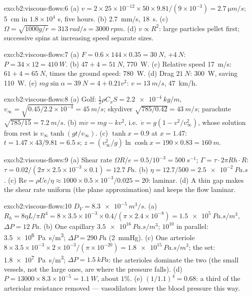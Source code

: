\begin{solution}{exo:b2:viscous-flows:6}
(a) $v = 2 \times 25 \times 10^{-12} \times 50 \times 9.81/(9 \times 10^{-3}) = \qty{2.7}{\micro m/s}$;
\qty{5}{cm} in $1.8 \times 10^4$ s, five hours. (b) \qty{2.7}{mm/s}, \qty{18}{s}. (c)
$\Omega = \sqrt{1000g/r} = \qty{313}{rad/s} = \qty{3000}{rpm}$. (d) $v \propto R^2$: large
particles pellet first; successive spins at increasing speed separate
sizes.
\end{solution}

\begin{solution}{exo:b2:viscous-flows:7}
(a) $F = 0.6 \times 144 \times 0.35 = \qty{30}{N}$, $+\qty{4}{N}$: $P = 34 \times 12 =
\qty{410}{W}$. (b) $47 + 4 = \qty{51}{N}$, \qty{770}{W}. (c) Relative speed
\qty{17}{m/s}: $61 + 4 = \qty{65}{N}$, times the ground speed: \qty{780}{W}. (d)
Drag $\qty{21}{N}$: \qty{300}{W}, saving \qty{110}{W}. (e) $mg\sin\alpha = \qty{39}{N} =
4 + 0.21v^2$: $v = \qty{13}{m/s}$, \qty{47}{km/h}.
\end{solution}

\begin{solution}{exo:b2:viscous-flows:8}
(a) Golf: $\tfrac12\rho C_xS = \qty{2.2e-4}{kg/m}$, $v_\infty = \sqrt{0.45/2.2 \times 10^{-4}}
= \qty{45}{m/s}$; skydiver $\sqrt{785/0.42} = \qty{43}{m/s}$; parachute $\sqrt{785/15} =
\qty{7.2}{m/s}$. (b) $m\dot v = mg - kv^2$, i.e.\ $\dot v = g(1 - v^2/v_\infty^2)$,
whose solution from rest is $v_\infty\tanh(gt/v_\infty)$. (c) $\tanh x = 0.9$ at
$x = 1.47$: $t = 1.47 \times 43/9.81 = \qty{6.5}{s}$; $z = (v_\infty^2/g)\ln\cosh x =
190 \times 0.83 = \qty{160}{m}$.
\end{solution}

\begin{solution}{exo:b2:viscous-flows:9}
(a) Shear rate $\Omega R/e = 0.5/10^{-3} = \qty{500}{s^{-1}}$; $\Gamma = \tau\cdot2\pi Rh
\cdot R$: $\tau = 0.02/(2\pi \times 2.5 \times 10^{-3} \times 0.1) = \qty{12.7}{Pa}$. (b) $\eta
= 12.7/500 = \qty{2.5e-2}{Pa.s}$. (c) $\mathrm{Re} = \rho Ue/\eta \approx 1000 \times 0.5 \times
10^{-3}/0.025 = 20$: laminar. (d) A thin gap makes the shear rate uniform
(the plane approximation) and keeps the flow laminar.
\end{solution}

\begin{solution}{exo:b2:viscous-flows:10}
$D_V = \qty{8.3e-5}{m^3/s}$. (a) $R_h = 8\eta L/\pi R^4 = 8 \times 3.5 \times 10^{-3} \times
0.4/(\pi \times 2.4 \times 10^{-8}) = \qty{1.5e5}{Pa.s/m^3}$, $\Delta P = \qty{12}{Pa}$. (b)
One capillary $\qty{3.5e16}{Pa.s/m^3}$; $10^{10}$ in parallel: \qty{3.5e6}{Pa.s/m^3};
$\Delta P = \qty{290}{Pa}$ (\qty{2}{mmHg}). (c) One arteriole $8 \times 3.5 \times 10^{-3}
\times 2 \times 10^{-3}/(\pi \times 10^{-20}) = \qty{1.8e15}{Pa.s/m^3}$; the set:
\qty{1.8e7}{Pa.s/m^3}; $\Delta P = \qty{1.5}{kPa}$: the arterioles dominate the
two (the small vessels, not the large ones, are where the pressure
falls). (d) $P = 13000 \times 8.3 \times 10^{-5} = \qty{1.1}{W}$, about $1\%$. (e)
$(1/1.1)^4 = 0.68$: a third of the arteriolar resistance removed ---
vasodilators lower the blood pressure this way.
\end{solution}

